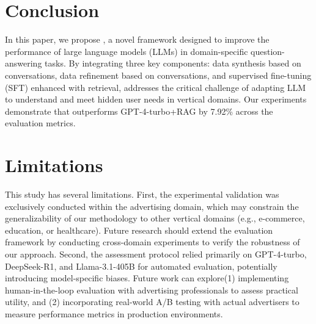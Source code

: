 \section{Conclusion}
In this paper, we propose \ourmodel, a novel framework designed to improve the performance of large language models (LLMs) in domain-specific question-answering tasks. By integrating three key components: data synthesis based on conversations, data refinement based on conversations, and supervised fine-tuning (SFT) enhanced with retrieval, \ourmodel addresses the critical challenge of adapting LLM to understand and meet hidden user needs in vertical domains. Our experiments demonstrate that \ourmodel outperforms GPT-4-turbo+RAG by 7.92\% across the evaluation metrics. 

\section{Limitations}
This study has several limitations. First, the experimental validation was exclusively conducted within the advertising domain, which may constrain the generalizability of our methodology to other vertical domains (e.g., e-commerce, education, or healthcare). Future research should extend the evaluation framework by conducting cross-domain experiments to verify the robustness of our approach. Second, the assessment protocol relied primarily on GPT-4-turbo, DeepSeek-R1, and Llama-3.1-405B for automated evaluation, potentially introducing model-specific biases. Future work can explore(1) implementing human-in-the-loop evaluation with advertising professionals to assess practical utility, and (2) incorporating real-world A/B testing with actual advertisers to measure performance metrics in production environments.